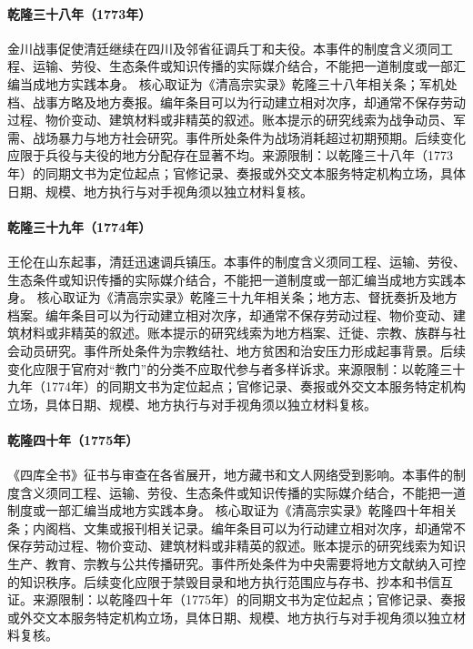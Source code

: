 \hypertarget{civic:EQ-1773-SICHUAN-RECRUITMENT}{}\paragraph{乾隆三十八年（1773年）}金川战事促使清廷继续在四川及邻省征调兵丁和夫役。本事件的制度含义须同工程、运输、劳役、生态条件或知识传播的实际媒介结合，不能把一道制度或一部汇编当成地方实践本身。 核心取证为《清高宗实录》乾隆三十八年相关条；军机处档、战事方略及地方奏报。编年条目可以为行动建立相对次序，却通常不保存劳动过程、物价变动、建筑材料或非精英的叙述。账本提示的研究线索为战争动员、军需、战场暴力与地方社会研究。事件所处条件为战场消耗超过初期预期。后续变化应限于兵役与夫役的地方分配存在显著不均。来源限制：以乾隆三十八年（1773年）的同期文书为定位起点；官修记录、奏报或外交文本服务特定机构立场，具体日期、规模、地方执行与对手视角须以独立材料复核。
\hypertarget{civic:EQ-1774-WANG-LUN-UPRISING}{}\paragraph{乾隆三十九年（1774年）}王伦在山东起事，清廷迅速调兵镇压。本事件的制度含义须同工程、运输、劳役、生态条件或知识传播的实际媒介结合，不能把一道制度或一部汇编当成地方实践本身。 核心取证为《清高宗实录》乾隆三十九年相关条；地方志、督抚奏折及地方档案。编年条目可以为行动建立相对次序，却通常不保存劳动过程、物价变动、建筑材料或非精英的叙述。账本提示的研究线索为地方档案、迁徙、宗教、族群与社会动员研究。事件所处条件为宗教结社、地方贫困和治安压力形成起事背景。后续变化应限于官府对“教门”的分类不应取代参与者多样诉求。来源限制：以乾隆三十九年（1774年）的同期文书为定位起点；官修记录、奏报或外交文本服务特定机构立场，具体日期、规模、地方执行与对手视角须以独立材料复核。
\hypertarget{civic:EQ-1775-SIKU-COLLECTION}{}\paragraph{乾隆四十年（1775年）}《四库全书》征书与审查在各省展开，地方藏书和文人网络受到影响。本事件的制度含义须同工程、运输、劳役、生态条件或知识传播的实际媒介结合，不能把一道制度或一部汇编当成地方实践本身。 核心取证为《清高宗实录》乾隆四十年相关条；内阁档、文集或报刊相关记录。编年条目可以为行动建立相对次序，却通常不保存劳动过程、物价变动、建筑材料或非精英的叙述。账本提示的研究线索为知识生产、教育、宗教与公共传播研究。事件所处条件为中央需要将地方文献纳入可控的知识秩序。后续变化应限于禁毁目录和地方执行范围应与存书、抄本和书信互证。来源限制：以乾隆四十年（1775年）的同期文书为定位起点；官修记录、奏报或外交文本服务特定机构立场，具体日期、规模、地方执行与对手视角须以独立材料复核。
